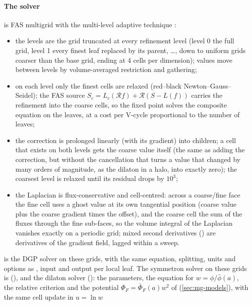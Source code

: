 \paragraph*{The solver} is FAS multigrid with the multi-level adaptive technique \cite{Brandt1977}:
\begin{itemize}
\item the levels are the grid truncated at every refinement level (level 0 the full grid, level 1 every finest leaf replaced
      by its parent, \ldots, down to uniform grids coarser than the base grid, ending at 4 cells per dimension); values move
      between levels by volume-averaged restriction and gathering;
\item on each level only the finest cells are relaxed (red--black Newton--Gauss--Seidel); the FAS source
      $S_c=L_c(\mathcal Rf)+\mathcal R(S-L(f))$ carries the refinement into the coarse cells, so the fixed point solves the
      composite equation on the leaves, at a cost per V-cycle proportional to the number of leaves;
\item the correction is prolonged linearly (with its gradient) into children; a cell that exists on both levels gets
      the coarse value itself (the same as adding the correction, but without the cancellation that turns a value that
      changed by many orders of magnitude, as the dilaton in a halo, into exactly zero); the coarsest level is relaxed until its residual drops by $10^3$;
\item the Laplacian is flux-conservative and cell-centred: across a coarse/fine face the fine cell uses a ghost value at its
      own tangential position (coarse value plus the coarse gradient times the offset), and the coarse cell the sum of the
      fluxes through the fine sub-faces, so the volume integral of the Laplacian vanishes exactly on a periodic grid; mixed
      second derivatives () are derivatives of the gradient field, lagged within a sweep.
\end{itemize}
 is the DGP solver on these grids, with the same equation, splitting, units and options as
, input and output per local leaf. The symmetron solver on these grids is
 (), and the dilaton solver 
(): the parameters, the equation for $w=\phi/\bar\phi(a)$, the relative criterion and the potential
$\Phi_F=\bar\Phi_F(a)w^2$ of  (\cref{sec:mg-models}), with the same cell update in $u=\ln w$
